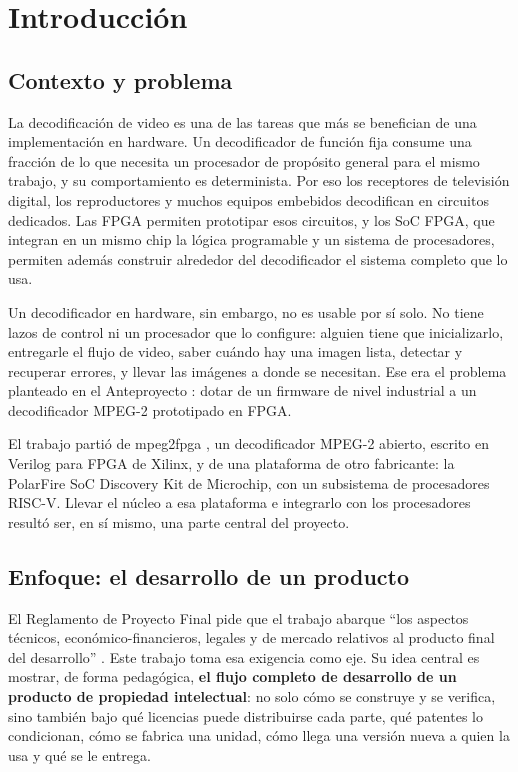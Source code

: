 \chapter{Introducción}
\label{cap:introduccion}

\section{Contexto y problema}

La decodificación de video es una de las tareas que más se benefician de una
implementación en hardware. Un decodificador de función fija consume una
fracción de lo que necesita un procesador de propósito general para el mismo
trabajo, y su comportamiento es determinista. Por eso los receptores de
televisión digital, los reproductores y muchos equipos embebidos decodifican
en circuitos dedicados. Las FPGA permiten prototipar esos circuitos, y los SoC
FPGA, que integran en un mismo chip la lógica programable y un sistema de
procesadores, permiten además construir alrededor del decodificador el
sistema completo que lo usa.

Un decodificador en hardware, sin embargo, no es usable por sí solo. No
tiene lazos de control ni un procesador que lo configure: alguien tiene que
inicializarlo, entregarle el flujo de video, saber cuándo hay una imagen
lista, detectar y recuperar errores, y llevar las imágenes a donde se
necesitan. Ese era el problema planteado en el Anteproyecto
\citep{Bustamante_2025_anteproyecto}: dotar de un firmware de nivel
industrial a un decodificador MPEG-2 prototipado en FPGA.

El trabajo partió de mpeg2fpga \citep{De_Vleeschauwer_2017}, un
decodificador MPEG-2 abierto, escrito en Verilog para FPGA de Xilinx, y de una
plataforma de otro fabricante: la PolarFire SoC Discovery Kit de Microchip,
con un subsistema de procesadores RISC-V. Llevar el núcleo a esa plataforma e
integrarlo con los procesadores resultó ser, en sí mismo, una parte central
del proyecto.

\section{Enfoque: el desarrollo de un producto}

El Reglamento de Proyecto Final pide que el trabajo abarque \enquote{los
aspectos técnicos, económico-financieros, legales y de mercado relativos al
producto final del desarrollo} \citep[punto 1.2]{UTN_FRLR_2023_reglamento}.
Este trabajo toma esa exigencia como eje. Su idea central es mostrar, de forma
pedagógica, \textbf{el flujo completo de desarrollo de un producto de
propiedad intelectual}: no solo cómo se construye y se verifica, sino también
bajo qué licencias puede distribuirse cada parte, qué patentes lo
condicionan, cómo se fabrica una unidad, cómo llega una versión nueva a quien
la usa y qué se le entrega.

